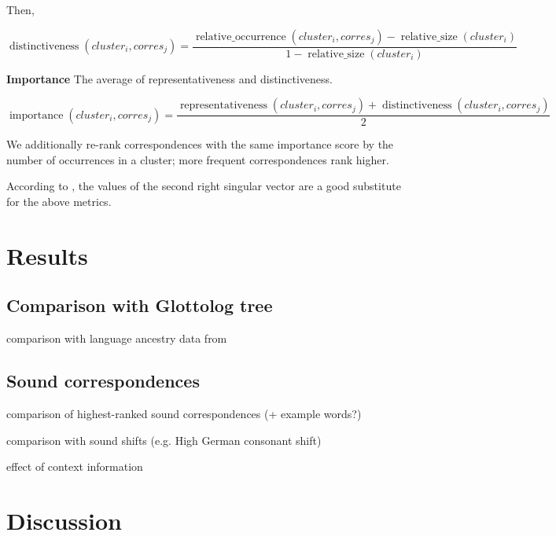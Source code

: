 \documentclass{article}
\begin{document}
Then, 

\begin{equation*}
\operatorname{distinctiveness}(cluster_i, corres_j) = 
\frac{\operatorname{relative\_occurrence}(cluster_i, corres_j) - \operatorname{relative\_size}(cluster_i)}
{1 - \operatorname{relative\_size}(cluster_i)}
\end{equation*}

\textbf{Importance}
The average of representativeness and distinctiveness.

\begin{equation*}
\operatorname{importance}(cluster_i, corres_j) = 
\frac{\operatorname{representativeness}(cluster_i, corres_j) + \operatorname{distinctiveness}(cluster_i, corres_j)}
{2}
\end{equation*}

We additionally re-rank correspondences with the same importance score by the number of occurrences in a cluster; more frequent correspondences rank higher.


According to \citet{wieling2010hierarchical}, the values of the second right singular vector are a good substitute for the above metrics.

\section{Results}

\subsection{Comparison with Glottolog tree}
comparison with language ancestry data from \citet{hammarstrom2018glottolog}

\subsection{Sound correspondences}
comparison of highest-ranked sound correspondences
(+ example words?)

comparison with sound shifts (e.g. High German consonant shift)

effect of context information

\section{Discussion}
\end{document}
